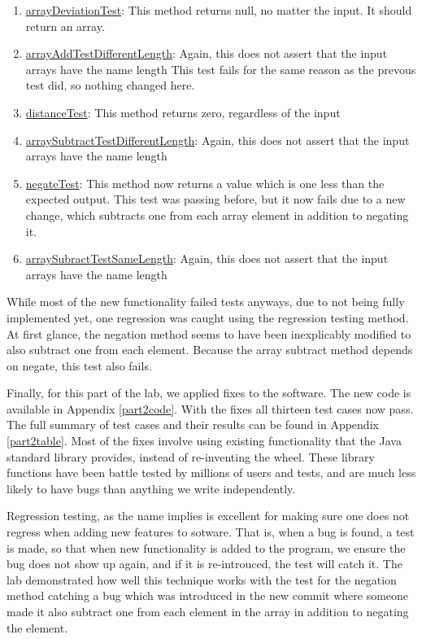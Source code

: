 \begin{enumerate}
  \item \underline{arrayDeviationTest}:
    This method returns null, no matter the input. It should return an array.
  \item \underline{arrayAddTestDifferentLength}:
    Again, this does not assert that the input arrays have the name length
    This test fails for the same reason as the prevous test did, so nothing
    changed here.
  \item \underline{distanceTest}:
    This method returns zero, regardless of the input
  \item \underline{arraySubtractTestDifferentLength}:
    Again, this does not assert that the input arrays have the name length
  \item \underline{negateTest}:
    This method now returns a value which is one less than the expected output.
    This test was passing before, but it now fails due to a new change, which
    subtracts one from each array element in addition to negating it.
  \item \underline{arraySubractTestSameLength}:
    Again, this does not assert that the input arrays have the name length
\end{enumerate}

While most of the new functionality failed tests anyways, due to not being fully
implemented yet, one regression was caught using the regression testing method.
At first glance, the negation method seems to have been inexplicably modified to
also subtract one from each element. Because the array subtract method depends
on negate, this test also fails. 


Finally, for this part of the lab, we applied fixes to the software. The new
code is available in Appendix \ref{part2code}. With the fixes all thirteen test
cases now pass. The full summary of test cases and their results can be found in
Appendix \ref{part2table}. Most of the fixes involve using existing
functionality that the Java standard library provides, instead of re-inventing
the wheel. These library functions have been battle tested by millions of users
and tests, and are much less likely to have bugs than anything we write
independently.

Regression testing, as the name implies is excellent for making sure one does
not regress when adding new features to sotware. That is, when a bug is found, a
test is made, so that when new functionality is added to the program, we ensure
the bug does not show up again, and if it is re-introuced, the test will catch
it. The lab demonstrated how well this technique works with the test for the
negation method catching a bug which was introduced in the new commit where
someone made it also subtract one from each element in the array in addition to
negating the element.
